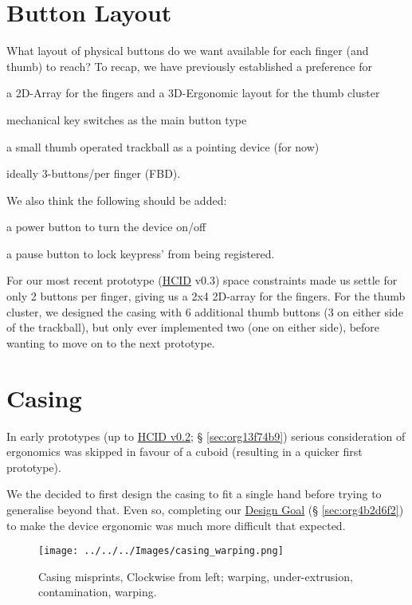 \documentclass[logo,bsc,singlespacing,parskip]{infthesis}
\begin{document}
\section{Button Layout}
\label{sec:org9f7c5a1}
What layout of physical buttons do we want available for each finger (and thumb) to reach?
To recap, we have previously established a preference for
\begin{enumerate*}[label={\arabic*)}, itemjoin={, \,}, itemjoin*={, and \,}]
\item a 2D-Array for the fingers and a 3D-Ergonomic layout for the thumb cluster
\item mechanical key switches as the main button type
\item a small thumb operated trackball as a pointing device (for now)
\item ideally 3-buttons/per finger (FBD).
\end{enumerate*}
We also think the following should be added:
\begin{enumerate*}[label={\arabic*)}, itemjoin={, \,}, itemjoin*={, and \,}]
\item a power button to turn the device on/off
\item a pause button to lock keypress' from being registered.
\end{enumerate*}

For our most recent prototype (\hyperref[org917851e]{HCID} v0.3) space constraints made us settle for only 2 buttons per finger, giving us a 2x4 2D-array for the fingers.
For the thumb cluster, we designed the casing with 6 additional thumb buttons (3 on either side of the trackball), but only ever implemented two (one on either side), before wanting to move on to the next prototype.
\section{Casing}
\label{sec:orgbd1f9a4}
In early prototypes (up to \hyperref[sec:org13f74b9]{HCID v0.2}; § \ref{sec:org13f74b9}) serious consideration of ergonomics was skipped in favour of a cuboid (resulting in a quicker first prototype).

We the decided to first design the casing to fit a single hand before trying to generalise beyond that.
Even so, completing our \hyperref[sec:org4b2d6f2]{Design Goal} (§ \ref{sec:org4b2d6f2}) to make the device ergonomic was much more difficult that expected.

\begin{wrapfigure}{r}{0.6\textwidth}
\centering
\texttt{[image: ../../../Images/casing\_warping.png]}
\caption[Casing misprints]{\label{fig:casing_misprints}Casing misprints, Clockwise from left; warping, under-extrusion, contamination, warping.}
\end{wrapfigure}
\end{document}
